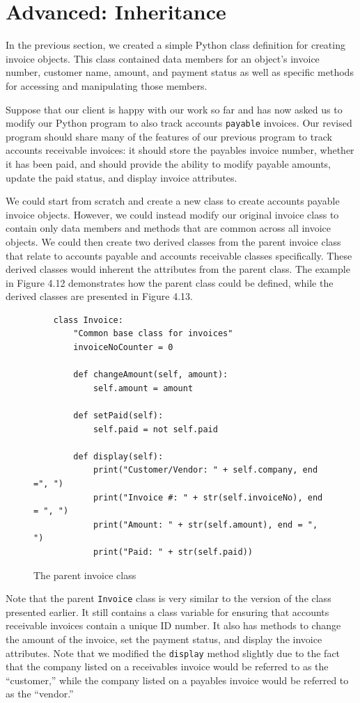 \documentclass{book}
\begin{document}
\section{Advanced: Inheritance}

In the previous section, we created a simple Python class definition for creating invoice objects. This class contained data members for an object's invoice number, customer name, amount, and payment status as well as specific methods for accessing and manipulating those members. 

Suppose that our client is happy with our work so far and has now asked us to modify our Python program to also track accounts \texttt{payable} invoices. Our revised program should share many of the features of our previous program to track accounts receivable invoices: it should store the payables invoice number, whether it has been paid, and should provide the ability to modify payable amounts, update the paid status, and display invoice attributes. 

We could start from scratch and create a new class to create accounts payable invoice objects. However, we could instead modify our original invoice class to contain only data members and methods that are common across all invoice objects. We could then create two derived classes from the parent invoice class that relate to accounts payable and accounts receivable classes specifically. These derived classes would inherent the attributes from the parent class. The example in Figure 4.12 demonstrates how the parent class could be defined, while the derived classes are presented in Figure 4.13.

\begin{figure}[h]
	\caption{The parent invoice class}
	\begin{lstlisting}
	class Invoice:
		"Common base class for invoices"
		invoiceNoCounter = 0

		def changeAmount(self, amount):
			self.amount = amount

		def setPaid(self):
			self.paid = not self.paid

		def display(self):
			print("Customer/Vendor: " + self.company, end =", ") 
			print("Invoice #: " + str(self.invoiceNo), end = ", ")
			print("Amount: " + str(self.amount), end = ", ")
			print("Paid: " + str(self.paid))
	\end{lstlisting}
\end{figure}

Note that the parent \texttt{Invoice} class is very similar to the version of the class presented earlier. It still contains a class variable for ensuring that accounts receivable invoices contain a unique ID number. It also has methods to change the amount of the invoice, set the payment status, and display the invoice attributes.  Note that we modified the \texttt{display} method slightly due to the fact that the company listed on a receivables invoice would be referred to as the ``customer,'' while the company listed on a payables invoice would be referred to as the ``vendor.''
\end{document}
